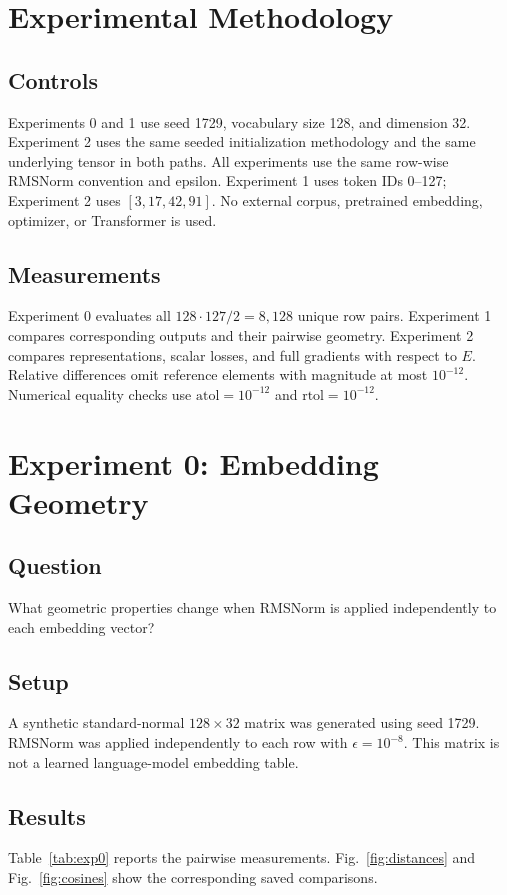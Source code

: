 \documentclass[conference]{IEEEtran}
\begin{document}
\section{Experimental Methodology}
\subsection{Controls}
Experiments 0 and 1 use seed 1729, vocabulary size 128, and dimension 32. Experiment 2 uses the same seeded initialization methodology and the same underlying tensor in both paths. All experiments use the same row-wise RMSNorm convention and epsilon. Experiment 1 uses token IDs 0--127; Experiment 2 uses \([3,17,42,91]\). No external corpus, pretrained embedding, optimizer, or Transformer is used.

\subsection{Measurements}
Experiment 0 evaluates all \(128\cdot127/2=8{,}128\) unique row pairs. Experiment 1 compares corresponding outputs and their pairwise geometry. Experiment 2 compares representations, scalar losses, and full gradients with respect to \(E\). Relative differences omit reference elements with magnitude at most \(10^{-12}\). Numerical equality checks use \(\mathrm{atol}=10^{-12}\) and \(\mathrm{rtol}=10^{-12}\).

\section{Experiment 0: Embedding Geometry}
\subsection{Question}
What geometric properties change when RMSNorm is applied independently to each embedding vector?

\subsection{Setup}
A synthetic standard-normal \(128\times32\) matrix was generated using seed 1729. RMSNorm was applied independently to each row with \(\epsilon=10^{-8}\). This matrix is not a learned language-model embedding table.

\subsection{Results}
Table~\ref{tab:exp0} reports the pairwise measurements. Fig.~\ref{fig:distances} and Fig.~\ref{fig:cosines} show the corresponding saved comparisons.
\end{document}
